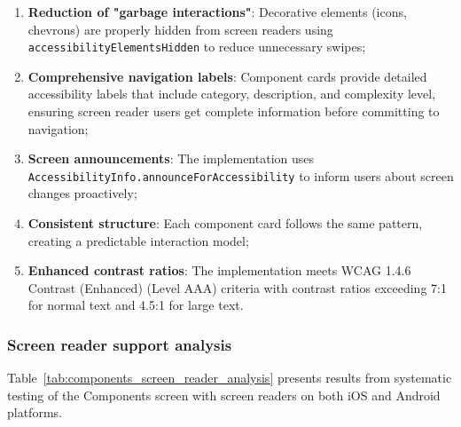 \begin{enumerate}
    \item \textbf{Reduction of "garbage interactions"}: Decorative elements (icons, chevrons) are properly hidden from screen readers using \texttt{accessibilityElementsHidden} to reduce unnecessary swipes;
    
    \item \textbf{Comprehensive navigation labels}: Component cards provide detailed accessibility labels that include category, description, and complexity level, ensuring screen reader users get complete information before committing to navigation;
    
    \item \textbf{Screen announcements}: The implementation uses \\ \texttt{AccessibilityInfo.announceForAccessibility} to inform users about screen changes proactively;
    
    \item \textbf{Consistent structure}: Each component card follows the same pattern, creating a predictable interaction model;
    
    \item \textbf{Enhanced contrast ratios}: The implementation meets WCAG 1.4.6 Contrast (Enhanced) (Level AAA) criteria with contrast ratios exceeding 7:1 for normal text and 4.5:1 for large text.
\end{enumerate}

\FloatBarrier

\subsubsection{Screen reader support analysis}

Table~\ref{tab:components_screen_reader_analysis} presents results from systematic testing of the Components screen with screen readers on both iOS and Android platforms.

